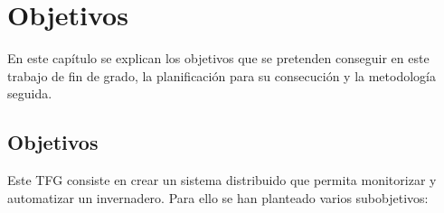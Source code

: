 \documentclass[a4paper, 12pt, oneside]{book}
\begin{document}
%
%
%  
%  
%  

\cleardoublepage %
\chapter{Objetivos} %
\label{chap:objetivos} %
En este capítulo se explican los objetivos que se pretenden conseguir en este trabajo de fin de grado, la planificación para su consecución y la metodología seguida.


\section{Objetivos}
\label{sec:objetivos}

Este TFG consiste en crear un sistema distribuido que permita monitorizar y automatizar un invernadero. Para ello se han planteado varios subobjetivos:
\end{document}

